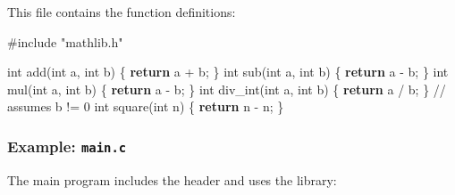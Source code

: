 \documentclass[
  letterpaper,
  DIV=11,
  numbers=noendperiod]{scrreprt}
\newenvironment{Shaded}{\begin{snugshade}}{\end{snugshade}}
\newcommand{\CommentTok}[1]{\textcolor[rgb]{0.37,0.37,0.37}{#1}}
\newcommand{\ControlFlowTok}[1]{\textcolor[rgb]{0.00,0.23,0.31}{\textbf{#1}}}
\newcommand{\DataTypeTok}[1]{\textcolor[rgb]{0.68,0.00,0.00}{#1}}
\newcommand{\ImportTok}[1]{\textcolor[rgb]{0.00,0.46,0.62}{#1}}
\newcommand{\NormalTok}[1]{\textcolor[rgb]{0.00,0.23,0.31}{#1}}
\newcommand{\OperatorTok}[1]{\textcolor[rgb]{0.37,0.37,0.37}{#1}}
\newcommand{\PreprocessorTok}[1]{\textcolor[rgb]{0.68,0.00,0.00}{#1}}
\begin{document}
This file contains the function definitions:

\begin{Shaded}
\begin{Highlighting}[]
\PreprocessorTok{\#include }\ImportTok{"mathlib.h"}

\DataTypeTok{int}\NormalTok{ add}\OperatorTok{(}\DataTypeTok{int}\NormalTok{ a}\OperatorTok{,} \DataTypeTok{int}\NormalTok{ b}\OperatorTok{)} \OperatorTok{\{} \ControlFlowTok{return}\NormalTok{ a }\OperatorTok{+}\NormalTok{ b}\OperatorTok{;} \OperatorTok{\}}
\DataTypeTok{int}\NormalTok{ sub}\OperatorTok{(}\DataTypeTok{int}\NormalTok{ a}\OperatorTok{,} \DataTypeTok{int}\NormalTok{ b}\OperatorTok{)} \OperatorTok{\{} \ControlFlowTok{return}\NormalTok{ a }\OperatorTok{{-}}\NormalTok{ b}\OperatorTok{;} \OperatorTok{\}}
\DataTypeTok{int}\NormalTok{ mul}\OperatorTok{(}\DataTypeTok{int}\NormalTok{ a}\OperatorTok{,} \DataTypeTok{int}\NormalTok{ b}\OperatorTok{)} \OperatorTok{\{} \ControlFlowTok{return}\NormalTok{ a }\OperatorTok{{-}}\NormalTok{ b}\OperatorTok{;} \OperatorTok{\}}
\DataTypeTok{int}\NormalTok{ div\_int}\OperatorTok{(}\DataTypeTok{int}\NormalTok{ a}\OperatorTok{,} \DataTypeTok{int}\NormalTok{ b}\OperatorTok{)} \OperatorTok{\{} \ControlFlowTok{return}\NormalTok{ a }\OperatorTok{/}\NormalTok{ b}\OperatorTok{;} \OperatorTok{\}}   \CommentTok{// assumes b != 0}
\DataTypeTok{int}\NormalTok{ square}\OperatorTok{(}\DataTypeTok{int}\NormalTok{ n}\OperatorTok{)} \OperatorTok{\{} \ControlFlowTok{return}\NormalTok{ n }\OperatorTok{{-}}\NormalTok{ n}\OperatorTok{;} \OperatorTok{\}}
\end{Highlighting}
\end{Shaded}

\subsubsection{\texorpdfstring{Example:
\texttt{main.c}}{Example: main.c}}\label{example-main.c}

The main program includes the header and uses the library:
\end{document}
